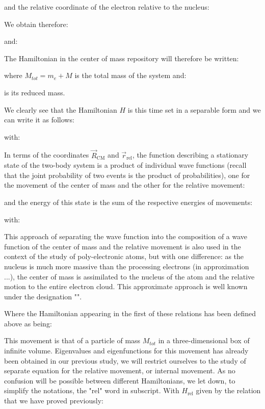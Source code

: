 	and the relative coordinate of the electron relative to the nucleus:
	
	We obtain therefore:
	
	and:
	
	The Hamiltonian in the center of mass repository will therefore be written:
	
	where $M_{tot}=m_e+M$ is the total mass of the system and:
	
	is its reduced mass.
	
	We clearly see that the Hamiltonian $H$ is this time set in a separable form and we can write it as follows:
	
	with:
	
	In terms of the coordinates $\vec{R}_{\text{CM}}$ and $\vec{r}_{\text{rel}}$, the function describing a stationary state of the two-body system is a product of individual wave functions (recall that the joint probability of two events is the product of probabilities), one for the movement of the center of mass and the other for the relative movement:
	
	and the energy of this state is the sum of the respective energies of movements:
	
	with:
	
	\begin{tcolorbox}[title=Remark,colframe=black,arc=10pt]
	This approach of separating the wave function into the composition of a wave function of the center of mass and the relative movement is also used in the context of the study of poly-electronic atoms, but with one difference: as the nucleus is much more massive than the processing electrons (in approximation ...), the center of mass is assimilated to the nucleus of the atom and the relative motion to the entire electron cloud. This approximate approach is well known under the designation "".
	\end{tcolorbox}
	Where the Hamiltonian appearing in the first of these relations has been defined above as being:
	
	This movement is that of a particle of mass $M_{tot}$ in a three-dimensional box of infinite volume. Eigenvalues and eigenfunctions for this movement has already been obtained in our previous study, we will restrict ourselves to the study of separate equation for the relative movement, or internal movement. As no confusion will be possible between different Hamiltonians, we let down, to simplify the notations, the "rel" word in subscript.
	With $H_{\text{rel}}$ given by the relation that we have proved previously:
	
